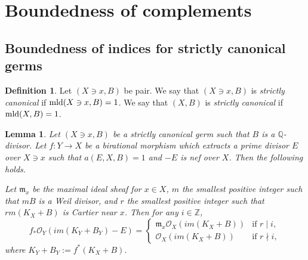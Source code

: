 \documentclass[11pt]{amsart}
\numberwithin{equation}{section}
\newcommand{\Qq}{\mathbb{Q}}
\newcommand{\mld}{{\rm{mld}}}
\newtheorem{lem}[thm]{Lemma}
\theoremstyle{definition}
\theoremstyle{definition}
\newtheorem{defn}[thm]{Definition}
\begin{document}
\section{Boundedness of complements}\label{section: Boundedness of complements}

\subsection{Boundedness of indices for strictly canonical germs}\label{subsection: rr}

\begin{defn}
Let $(X\ni x,B)$ be pair. We say that $(X\ni x,B)$ is \emph{strictly canonical} if $\mld(X\ni x,B)=1$. We say that $(X,B)$ is \emph{strictly canonical} if $\mld(X,B)=1$.
\end{defn}


\begin{lem}\label{lem: vanishing of the high direct image}
Let $(X\ni x,B)$ be a strictly canonical germ such that $B$ is a $\Qq$-divisor. Let $f: Y\rightarrow X$ be a birational morphism which extracts a prime divisor $E$ over $X\ni x$ such that $a(E,X,B)=1$ and $-E$ is nef over $X$. Then the following holds.

 Let $\mathfrak{m}_x$ be the maximal ideal sheaf for $x\in X$, $m$ the smallest positive integer such that $mB$ is a Weil divisor, and $r$ the smallest positive integer such that $rm(K_X+B)$ is Cartier near $x$. Then for any $i\in \mathbb{Z}$, $$f_*\mathcal{O}_Y(im(K_Y+B_Y)-E)=\begin{cases}\mathfrak{m}_x\mathcal{O}_X(im(K_X+B)) & \text{if } r\mid i,\\
    \mathcal{O}_X(im(K_X+B)) & \text{if } r\nmid i,
    \end{cases}$$ where $K_Y+B_Y:=f^*(K_X+B)$.
\end{lem}
\end{document}
